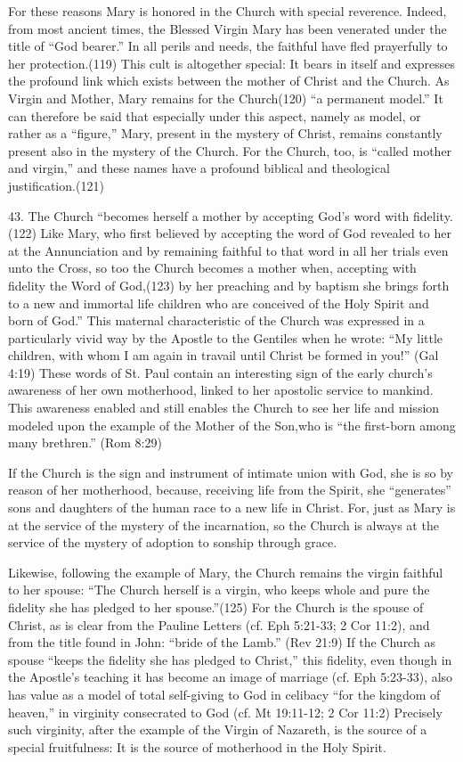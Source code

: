 \documentclass[oneside]{book}
\begin{document}
For these reasons Mary is honored in the Church with special reverence. Indeed,
from most ancient times, the Blessed Virgin Mary has been venerated under the
title of ``God bearer.'' In all perils and needs, the faithful have fled
prayerfully to her protection.(119) This cult is altogether special: It bears in
itself and expresses the profound link which exists between the mother of Christ
and the Church. As Virgin and Mother, Mary remains for the Church(120) ``a
permanent model.'' It can therefore be said that especially under this aspect,
namely as model, or rather as a ``figure,'' Mary, present in the mystery of
Christ, remains constantly present also in the mystery of the Church. For the
Church, too, is ``called mother and virgin,'' and these names have a profound
biblical and theological justification.(121)

43. The Church ``becomes herself a mother by accepting God's word with
fidelity. (122) Like Mary, who first believed by accepting the word of God
revealed to her at the Annunciation and by remaining faithful to that word in
all her trials even unto the Cross, so too the Church becomes a mother when,
accepting with fidelity the Word of God,(123) by her preaching and by baptism
she brings forth to a new and immortal life children who are conceived of the
Holy Spirit and born of God.'' This maternal characteristic of the Church was
expressed in a particularly vivid way by the Apostle to the Gentiles when he
wrote: ``My little children, with whom I am again in travail until Christ be
formed in you!'' (Gal 4:19) These words of St. Paul contain an interesting sign
of the early church's awareness of her own motherhood, linked to her apostolic
service to mankind. This awareness enabled and still enables the Church to see
her life and mission modeled upon the example of the Mother of the Son,who is
``the first-born among many brethren.'' (Rom 8:29)

If the Church is the sign and instrument of intimate union with God, she is so
by reason of her motherhood, because, receiving life from the Spirit, she
``generates'' sons and daughters of the human race to a new life in Christ. For,
just as Mary is at the service of the mystery of the incarnation, so the Church
is always at the service of the mystery of adoption to sonship through grace.

Likewise, following the example of Mary, the Church remains the virgin faithful
to her spouse: ``The Church herself is a virgin, who keeps whole and pure the
fidelity she has pledged to her spouse.''(125) For the Church is the spouse of
Christ, as is clear from the Pauline Letters
(cf. Eph 5:21-33; 2 Cor 11:2), and from the title found in John: ``bride of the
Lamb.'' (Rev 21:9) If the Church as spouse ``keeps the fidelity she has pledged
to Christ,'' this fidelity, even though in the Apostle's teaching it has become
an image of marriage (cf. Eph 5:23-33), also has value as a model of total
self-giving to God in celibacy ``for the kingdom of heaven,'' in virginity
consecrated to God (cf. Mt 19:11-12; 2 Cor 11:2) Precisely such virginity, after
the example of the Virgin of Nazareth, is the source of a special fruitfulness:
It is the source of motherhood in the Holy Spirit.
\end{document}
